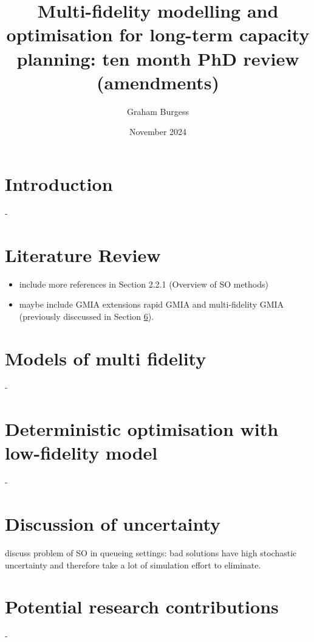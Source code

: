\documentclass[12pt,a4paper]{article}
\title{Multi-fidelity modelling and optimisation for long-term capacity planning: ten month PhD review (amendments)}
\author{Graham Burgess}
\date{November 2024}
\begin{document}
%
\maketitle
%

\section{Introduction}

-

\section{Literature Review} \label{lit-rev}
%
\begin{itemize}[noitemsep]
\item include more references in Section 2.2.1 (Overview of SO methods)
\item maybe include GMIA extensions rapid GMIA and multi-fidelity GMIA (previously disccussed in Section \ref{mfso}). 
\end{itemize}
%
\section{Models of multi fidelity} \label{models}

- 

\section{Deterministic optimisation with low-fidelity model} \label{do}

- 

\section{Discussion of uncertainty} \label{uncert}

discuss problem of SO in queueing settings: bad solutions have high stochastic uncertainty and therefore take a lot of simulation effort to eliminate. 

\section{Potential research contributions} \label{mfso}

-
\end{document}
